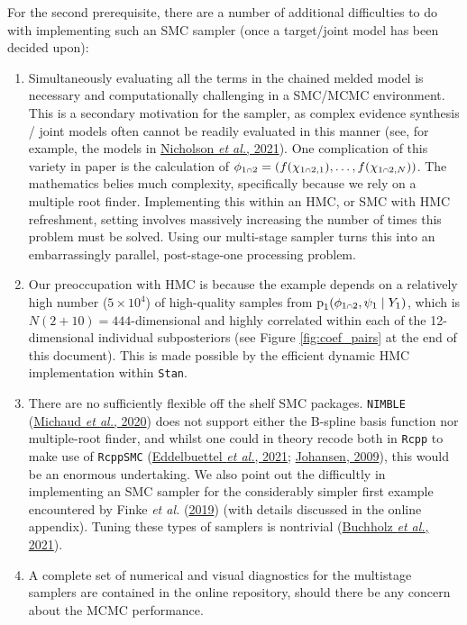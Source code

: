\documentclass[
  10pt,
  a4paper,
]{article}
\providecommand{\tightlist}{%
  \setlength{\itemsep}{0pt}\setlength{\parskip}{0pt}}
\let\Oldcap\cap
\renewcommand{\cap}{\mathrel{\mathsmaller{\Oldcap}}}
\newcommand{\pd}{\text{p}}
\begin{document}
For the second prerequisite, there are a number of additional
difficulties to do with implementing such an SMC sampler (once a
target/joint model has been decided upon):

\begin{enumerate}
\def\labelenumi{\arabic{enumi}.}
\tightlist
\item
  Simultaneously evaluating all the terms in the chained melded model is
  necessary and computationally challenging in a SMC/MCMC environment.
  This is a secondary motivation for the sampler, as complex evidence
  synthesis / joint models often cannot be readily evaluated in this
  manner (see, for example, the models in
  \protect\hyperlink{ref-nicholson_interoperability_2021}{Nicholson
  \emph{et al.}, 2021}). One complication of this variety in paper is
  the calculation of
  \(\phi_{1 \cap 2} = (f(\chi_{1 \cap 2, 1}), \ldots, f(\chi_{1 \cap 2, N}))\).
  The mathematics belies much complexity, specifically because we rely
  on a multiple root finder. Implementing this within an HMC, or SMC
  with HMC refreshment, setting involves massively increasing the number
  of times this problem must be solved. Using our multi-stage sampler
  turns this into an embarrassingly parallel, post-stage-one processing
  problem.
\item
  Our preoccupation with HMC is because the example depends on a
  relatively high number (\(5 \times 10^{4}\)) of high-quality samples
  from \(\pd_{1}(\phi_{1 \cap 2}, \psi_{1} \mid Y_{1})\), which is
  \(N(2 + 10) = 444\)-dimensional and highly correlated within each of
  the 12-dimensional individual subposteriors (see Figure
  \ref{fig:coef_pairs} at the end of this document). This is made
  possible by the efficient dynamic HMC implementation within
  \texttt{Stan}.
\item
  There are no sufficiently flexible off the shelf SMC packages.
  \texttt{NIMBLE}
  (\protect\hyperlink{ref-michaud_sequential_2020}{Michaud \emph{et
  al.}, 2020}) does not support either the B-spline basis function nor
  multiple-root finder, and whilst one could in theory recode both in
  \texttt{Rcpp} to make use of \texttt{RcppSMC}
  (\protect\hyperlink{ref-eddelbuettel_rcppsmc_2021}{Eddelbuettel
  \emph{et al.}, 2021};
  \protect\hyperlink{ref-johansen_smctc_2009}{Johansen, 2009}), this
  would be an enormous undertaking. We also point out the difficultly in
  implementing an SMC sampler for the considerably simpler first example
  encountered by Finke \emph{et al.}
  (\protect\hyperlink{ref-finke_efficient_2019}{2019}) (with details
  discussed in the online appendix). Tuning these types of samplers is
  nontrivial (\protect\hyperlink{ref-buchholz_adaptive_2021}{Buchholz
  \emph{et al.}, 2021}).
\item
  A complete set of numerical and visual diagnostics for the multistage
  samplers are contained in the online repository, should there be any
  concern about the MCMC performance.
\end{enumerate}
\end{document}
